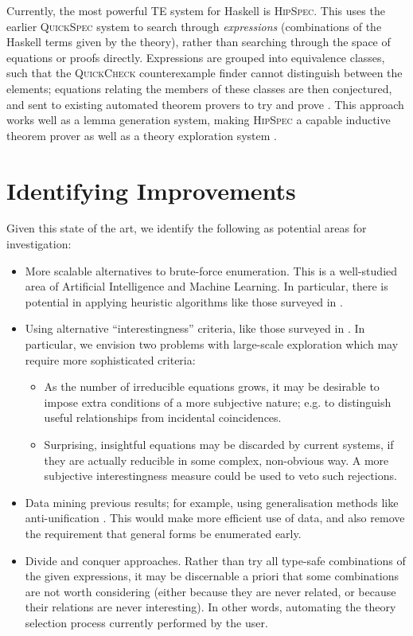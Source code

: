 \documentclass{llncs}
\begin{document}
Currently, the most powerful TE system for Haskell is \textsc{HipSpec}.
This uses the earlier \textsc{QuickSpec} system to search through
\emph{expressions} (combinations of the Haskell terms given by the theory),
rather than searching through the space of equations or proofs directly.
Expressions are grouped into equivalence classes, such that the
\textsc{QuickCheck} counterexample finder cannot distinguish between the
elements; equations relating the members of these classes are then conjectured,
and sent to existing automated theorem provers to try and prove
\cite{rosen2012proving}. This approach works well as a lemma generation system,
making \textsc{HipSpec} a capable inductive theorem prover as well as a theory
exploration system \cite{claessen2013automating}.

\section{Identifying Improvements}\label{improve}

Given this state of the art, we identify the following as potential
areas for investigation:

\begin{itemize}
\item
  More scalable alternatives to brute-force enumeration. This is a well-studied
  area of Artificial Intelligence and Machine Learning. In particular, there is
  potential in applying heuristic algorithms like those surveyed in
  \cite{blum2011hybrid}.
\item
  Using alternative ``interestingness'' criteria, like those surveyed in
  \cite{geng2006interestingness}. In particular, we envision two problems with
  large-scale exploration which may require more sophisticated criteria:

  \begin{itemize}
  \item
    As the number of irreducible equations grows, it may be desirable to
    impose extra conditions of a more subjective nature; e.g. to distinguish
    useful relationships from incidental coincidences.
  \item
    Surprising, insightful equations may be discarded by current systems, if
    they are actually reducible in some complex, non-obvious way. A more
    subjective interestingness measure could be used to veto such
    rejections.
  \end{itemize}
\item
  Data mining previous results; for example, using generalisation methods like
  anti-unification \cite{bulychev2010anti}. This would make more efficient use
  of data, and also remove the requirement that general forms be enumerated
  early.
\item
  Divide and conquer approaches. Rather than try all type-safe combinations of
  the given expressions, it may be discernable a priori that some combinations
  are not worth considering (either because they are never related, or because
  their relations are never interesting). In other words, automating the theory
  selection process currently performed by the user.
\end{itemize}
\end{document}
